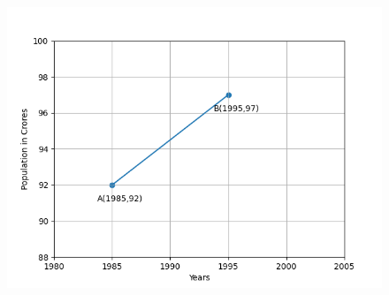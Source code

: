 \begin{enumerate}[label=\thesection.\arabic*,ref=\thesection.\theenumi]
\begin{figure}[ht]
\includegraphics[width = \columnwidth]{chapters/11/10/1/14/figs/fig.png}
\caption{}
\label{fig:chapters/11/10/1/14/1}
\end{figure}
\solution


\end{enumerate}
